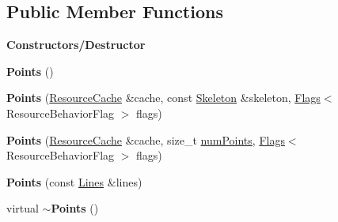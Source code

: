 \subsection*{Public Member Functions}
\begin{Indent}\textbf{ Constructors/\+Destructor}\par
\begin{DoxyCompactItemize}
\item 
\mbox{\label{classrev_1_1_points_a4846f3c99fa459ba9f2074e4f0960ee1}} 
{\bfseries Points} ()
\item 
\mbox{\label{classrev_1_1_points_a1daa812b67112b227ce7c0fe970a0be8}} 
{\bfseries Points} (\mbox{\hyperlink{classrev_1_1_resource_cache}{Resource\+Cache}} \&cache, const \mbox{\hyperlink{classrev_1_1_skeleton}{Skeleton}} \&skeleton, \mbox{\hyperlink{classrev_1_1_flags}{Flags}}$<$ Resource\+Behavior\+Flag $>$ flags)
\item 
\mbox{\label{classrev_1_1_points_af52e808ef122e63eb5453fb05464570e}} 
{\bfseries Points} (\mbox{\hyperlink{classrev_1_1_resource_cache}{Resource\+Cache}} \&cache, size\+\_\+t \mbox{\hyperlink{classrev_1_1_points_a4512153760c1a4f2d5b8b7dcaddec6de}{num\+Points}}, \mbox{\hyperlink{classrev_1_1_flags}{Flags}}$<$ Resource\+Behavior\+Flag $>$ flags)
\item 
\mbox{\label{classrev_1_1_points_a7970bc35482da5b6cbbf9ae16675d0c3}} 
{\bfseries Points} (const \mbox{\hyperlink{classrev_1_1_lines}{Lines}} \&lines)
\item 
\mbox{\label{classrev_1_1_points_a192f203e2318478ed0d7dfc2c4cb5341}} 
virtual {\bfseries $\sim$\+Points} ()
\end{DoxyCompactItemize}
\end{Indent}
